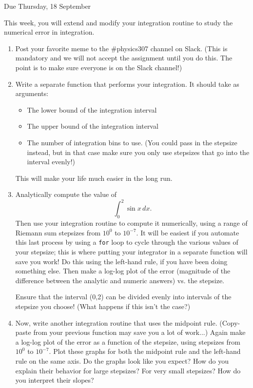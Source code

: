 \documentclass[12pt]{article}
\begin{document}
\Large
\centerline{}
\centerline{Due Thursday, 18 September}
\normalsize

This week, you will extend and modify your integration routine to study the numerical error in integration.
\begin{enumerate}

\item Post your favorite meme to the \#physics307 channel on Slack. (This is mandatory and we will not accept the assignment until you do this. The point is to make sure everyone is on the Slack channel!)

\item{Write a separate function that performs your integration. It should take as arguments:
	
	\begin{itemize}
		\item The lower bound of the integration interval
		\item The upper bound of the integration interval
		\item The number of integration bins to use. (You could pass in the stepsize instead, but
		in that case make sure you only use stepsizes that go into the interval evenly!)
	\end{itemize}
	
	This will make your life much easier in the long run.}

\item{Analytically compute the value of $$\int_{0}^{2} \sin x\, dx.$$ Then use your integration routine to compute it numerically, using a range of Riemann sum stepsizes from $10^{0}$
    to $10^{-7}$. It will be easiest if you automate this last process by using a {\tt for} loop to cycle through the various values of your stepsize; this is where putting your integrator in a separate function will save you work! Do this using the left-hand rule, if you have been doing something else. 
  Then make a log-log plot of the error (magnitude of the difference between the analytic and numeric answers) vs. the stepsize.

Ensure that the interval (0,2) can be divided evenly into intervals of the stepsize you choose! (What happens if this isn't the case?)}

\item{Now, write another integration routine that uses the midpoint rule. (Copy-paste from your previous function may save you a lot of work...) Again make a log-log plot of the error as a function of the stepsize, using stepsizes from $10^{0}$ to $10^{-7}$.
    Plot these graphs for both the midpoint rule and the left-hand rule on the same axis. Do the graphs look like you expect? How do you explain their behavior for large stepsizes?
  For very small stepsizes? How do you interpret their slopes?}


\end{enumerate}
\end{document}

